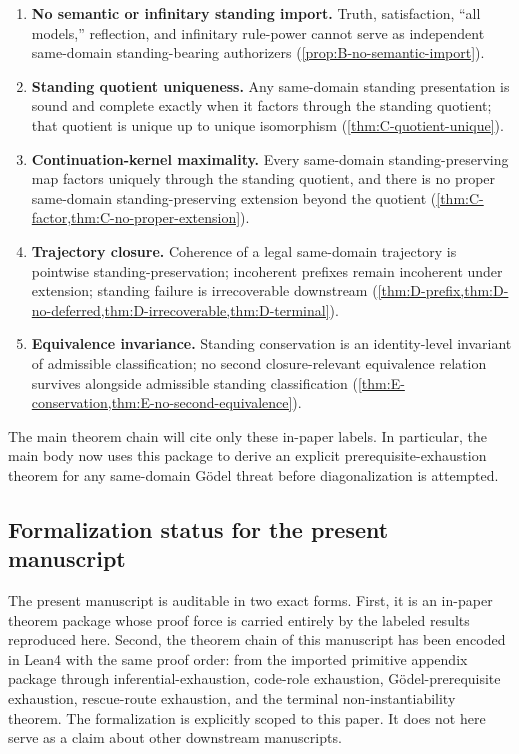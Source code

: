\documentclass[11pt]{article}
\theoremstyle{plain}
\theoremstyle{definition}
\begin{document}
\begin{enumerate}[label=\textbf{(P\arabic*)}, leftmargin=3.1em]
    \item \textbf{No semantic or infinitary standing import.} Truth, satisfaction, ``all models,'' reflection, and infinitary rule-power cannot serve as independent same-domain standing-bearing authorizers (\cref{prop:B-no-semantic-import}).

    \item \textbf{Standing quotient uniqueness.} Any same-domain standing presentation is sound and complete exactly when it factors through the standing quotient; that quotient is unique up to unique isomorphism (\cref{thm:C-quotient-unique}).

    \item \textbf{Continuation-kernel maximality.} Every same-domain standing-preserving map factors uniquely through the standing quotient, and there is no proper same-domain standing-preserving extension beyond the quotient (\cref{thm:C-factor,thm:C-no-proper-extension}).

    \item \textbf{Trajectory closure.} Coherence of a legal same-domain trajectory is pointwise standing-preservation; incoherent prefixes remain incoherent under extension; standing failure is irrecoverable downstream (\cref{thm:D-prefix,thm:D-no-deferred,thm:D-irrecoverable,thm:D-terminal}).

    \item \textbf{Equivalence invariance.} Standing conservation is an identity-level invariant of admissible classification; no second closure-relevant equivalence relation survives alongside admissible standing classification (\cref{thm:E-conservation,thm:E-no-second-equivalence}).
\end{enumerate}

The main theorem chain will cite only these in-paper labels. In particular, the main body now uses this package to derive an explicit prerequisite-exhaustion theorem for any same-domain G\"odel threat before diagonalization is attempted.

\subsection{Formalization status for the present manuscript}
\label{sec:formalization-status-main}

The present manuscript is auditable in two exact forms. First, it is an in-paper theorem package whose proof force is carried entirely by the labeled results reproduced here. Second, the theorem chain of this manuscript has been encoded in Lean4 with the same proof order: from the imported primitive appendix package through inferential-exhaustion, code-role exhaustion, G\"odel-prerequisite exhaustion, rescue-route exhaustion, and the terminal non-instantiability theorem. The formalization is explicitly scoped to this paper. It does not here serve as a claim about other downstream manuscripts.
\end{document}

